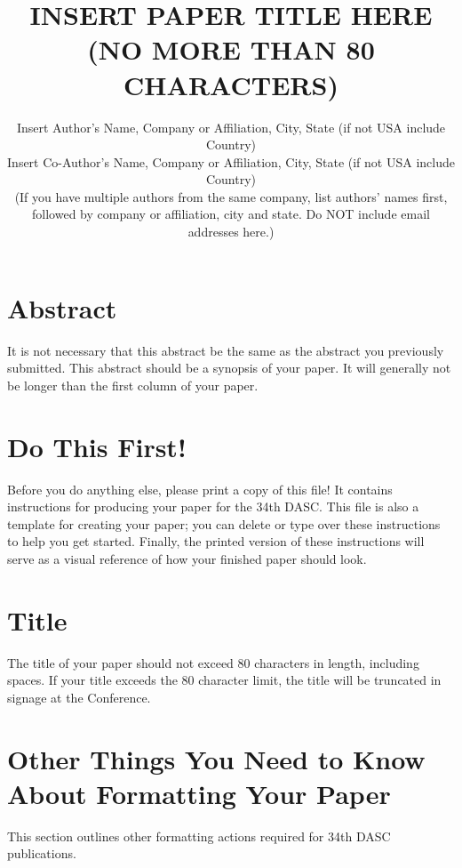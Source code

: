 \documentclass{dasc}
\title{\uppercase{INSERT PAPER TITLE HERE (NO MORE THAN 80 CHARACTERS)}}
\begin{document}
\author{
	Insert Author’s Name, Company or Affiliation, City, State (if not USA include Country)\\
	Insert Co-Author’s Name, Company or Affiliation, City, State (if not USA include Country)\\
	(If you have multiple authors from the same company, list authors' names first,\\
	followed by company or affiliation, city and state. Do NOT include email addresses here.)
}

\maketitle

\section*{Abstract}

It is not necessary that this abstract be the same as the abstract you previously submitted. This abstract should be a synopsis of your paper. It will generally not be longer than the first column of your paper.

\section*{Do This First!}

Before you do anything else, please print a copy of this file! It contains instructions for producing your paper for the 34th DASC. This file is also a template for creating your paper; you can delete or type over these instructions to help you get started. Finally, the printed version of these instructions will serve as a visual reference of how your finished paper should look.

\section*{Title}

The title of your paper should not exceed 80 characters in length, including spaces. If your title exceeds the 80 character limit, the title will be truncated in signage at the Conference.


\section*{Other Things You Need to Know About Formatting Your Paper}

This section outlines other formatting actions required for 34th DASC publications. 
\end{document}
